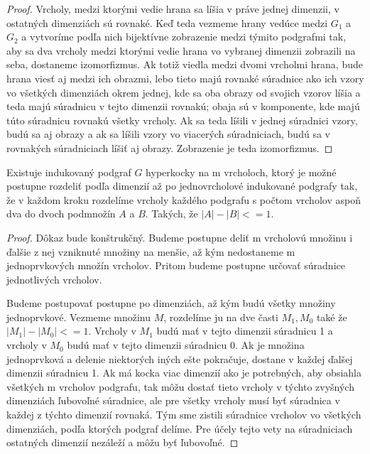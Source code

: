 \begin{proof}
Vrcholy, medzi ktorými vedie hrana sa líšia v práve jednej dimenzii, v
ostatných dimenziách sú rovnaké. Keď teda vezmeme hrany vedúce medzi 
$G_{1}$ a $G_{2}$ a vytvoríme podľa nich bijektívne zobrazenie medzi týmito
podgrafmi tak, aby sa dva vrcholy medzi ktorými vedie hrana vo vybranej
dimenzii zobrazili na seba, dostaneme izomorfizmus. Ak totiž viedla medzi
dvomi vrcholmi hrana, bude hrana viesť aj medzi ich obrazmi, lebo tieto majú
rovnaké súradnice ako ich vzory vo všetkých dimenziách okrem jednej, kde sa
oba obrazy od svojich vzorov líšia a teda majú súradnicu v tejto dimenzii 
rovnakú; obaja sú v komponente, kde majú túto súradnicu rovnakú všetky
vrcholy. Ak sa teda líšili v jednej súradnici vzory, budú sa aj obrazy a ak
sa líšili vzory vo viacerých súradniciach, budú sa v rovnakých súradniciach
líšiť aj obrazy. Zobrazenie  je teda izomorfizmus.
\end{proof}

\begin{lem}
\label{delenie}
Existuje indukovaný podgraf $G$ hyperkocky na m vrcholoch, ktorý je možné 
postupne rozdeliť
podľa dimenzií až po jednovrcholové indukované podgrafy tak, že v každom
kroku rozdelíme vrcholy každého podgrafu s počtom vrcholov aspoň dva do
dvoch podmnožín $A$ a $B$. Takých, že $|A| - |B| <= 1$.
\end{lem}

\begin{proof}
Dôkaz bude konštrukčný. Budeme postupne deliť m vrcholovú množinu i ďalšie z
nej vzniknuté množiny na menšie, až kým nedostaneme m jednoprvkových množín
vrcholov. Pritom budeme postupne určovať súradnice jednotlivých vrcholov.

Budeme postupovať postupne po dimenziách, až kým budú všetky množiny
jednoprvkové. Vezmeme množinu $M$, rozdelíme ju na dve časti $M_{1}, M_{0}$
také že $|M_{1}| - |M_{0}| <= 1$. Vrcholy v $M_{1}$ budú mať v tejto
dimenzii súradnicu 1 a vrcholy v $M_{0}$ budú mať v tejto dimenzii súradnicu
0. Ak je množina jednoprvková a delenie niektorých iných ešte pokračuje,
dostane v každej ďalšej dimenzii súradnicu 1. Ak má kocka viac dimenzií ako
je potrebných, aby obsiahla všetkých m vrcholov podgrafu, tak môžu dostať
tieto vrcholy v týchto zvyšných dimenziách ľubovoľné súradnice, ale pre
všetky vrcholy musí byť súradnica v každej z týchto dimenzií rovnaká.
Tým sme zistili súradnice vrcholov vo všetkých dimenziách, podľa ktorých
podgraf delíme. Pre účely tejto vety na súradniciach ostatných dimenzií
nezáleží a môžu byť ľubovoľné.
\end{proof}

